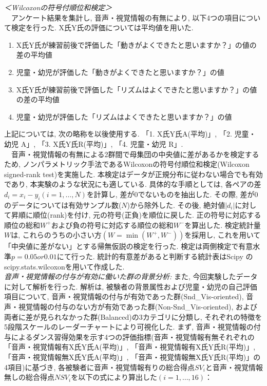 \documentclass[paper]{ieicej}
\begin{document}
\textit{＜Wilcoxonの符号付順位和検定＞}\\
　アンケート結果を集計し, 音声・視覚情報の有無により, 以下4つの項目について検定を行った. X氏Y氏の評価については平均値を用いた. 
\begin{enumerate}[label=\arabic*., nosep]
  \item X氏Y氏が練習前後で評価した「動きがよくできたと思いますか？」の値の差の平均値
  \item 児童・幼児が評価した「動きがよくできたと思いますか？」の値
  \item X氏Y氏が練習前後で評価した「リズムはよくできたと思いますか？」の値の差の平均値
  \item 児童・幼児が評価した「リズムはよくできたと思いますか？」の値
\end{enumerate}
上記については, 次の略称を以後使用する. 「1. X氏Y氏A(平均)」, 「2. 児童・幼児 A」, 「3. X氏Y氏R(平均)」, 「4. 児童・幼児 R」. \\
　音声・視覚情報の有無による2群間で母集団の中央値に差があるかを検定するため, ノンパラメトリック手法であるWilcoxonの符号付順位和検定(Wilcoxon signed-rank test)を実施した. 本検定はデータが正規分布に従わない場合でも有効であり, 本実験のような状況にも適している. 具体的な手順としては, 各ペアの差$d_{i}=x_{i}-y_{i} (i=1,\dots,N)$を計算し, 差が0でないものを抽出した. その際, 差が0のデータについては有効サンプル数($N$)から除外した. その後, 絶対値$|d_{i}|$に対して昇順に順位(rank)を付け, 元の符号(正負)を順位に戻した. 正の符号に対応する順位の総和$W^+$および負の符号に対応する順位の総和$W^-$を算出した. 検定統計量$W$は, これらのうちの小さい方$(W=\min(W^+,W^-))$を採用し, これを用いて「中央値に差がない」とする帰無仮説の検定を行った. 検定は両側検定で有意水準$p=0.05 or 0.01$にて行った. 統計的有意差があると判断する統計表はScipy \cite{ref27}のscipy.stats.wilcoxonを用いて作成した. \\
\emph{音声・視覚情報の付与が有効に働いた群の背景分析: }また, 今回実験したデータに対して解析を行った. 解析は, 被験者の背景属性および児童・幼児の自己評価項目について, 音声・視覚情報の付与が有効であった群(Snd\_Vis-oriented), 音声・視覚情報の付与のない方が有効であった群(Non-Snd\_Vis-oriented), および両者に差が見られなかった群(Balanced)の3カテゴリに分類し, それぞれの特徴を5段階スケールのレーダーチャートにより可視化した. まず, 音声・視覚情報の付与によるダンス習得効果を示す4つの評価指標(音声・視覚情報有無それぞれの「音声・視覚情報有X氏Y氏A(平均)」, 「音声・視覚情報有X氏Y氏R(平均)」, 「音声・視覚情報無X氏Y氏A(平均)」, 「音声・視覚情報無X氏Y氏R(平均)」の4項目)に基づき, 各被験者に音声・視覚情報有りの総合得点$SV_{i}$と音声・視覚情報無しの総合得点$NSV_{i}$を以下の式により算出した$(i=1,\dots,16)$：
\end{document}
